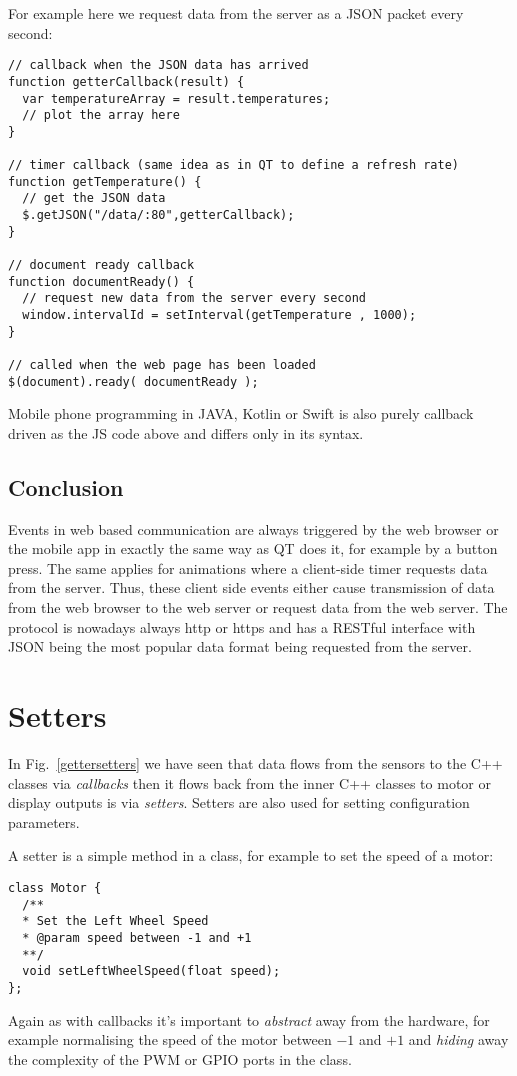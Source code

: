 \documentclass[12pt]{report}
\begin{document}
For example here we request data from the server as a JSON
packet every second:

\begin{verbatim}
// callback when the JSON data has arrived
function getterCallback(result) {
  var temperatureArray = result.temperatures;
  // plot the array here
}

// timer callback (same idea as in QT to define a refresh rate)
function getTemperature() {
  // get the JSON data
  $.getJSON("/data/:80",getterCallback);
}

// document ready callback
function documentReady() {
  // request new data from the server every second
  window.intervalId = setInterval(getTemperature , 1000);
}

// called when the web page has been loaded
$(document).ready( documentReady );
\end{verbatim}

Mobile phone programming in JAVA, Kotlin or Swift is also purely
callback driven as the JS code above and differs only in its syntax.

\section{Conclusion}
Events in web based communication are always triggered by the web
browser or the mobile app in exactly the same way as QT does it, for
example by a button press. The same applies for animations where a
client-side timer requests data from the server. Thus, these client
side events either cause transmission of data from the web browser to
the web server or request data from the web server. The protocol is
nowadays always http or https and has a RESTful interface with JSON
being the most popular data format being requested from the server.


\chapter{Setters}
In Fig.~\ref{gettersetters} we have seen that data flows from
the sensors to the C++ classes via \textsl{callbacks} then it flows
back from the inner C++ classes to motor or display outputs is via
\textsl{setters}. Setters are also used for setting configuration
parameters.

A setter is a simple method in a class, for example to set the
speed of a motor:
\begin{verbatim}
class Motor {
  /**
  * Set the Left Wheel Speed
  * @param speed between -1 and +1
  **/
  void setLeftWheelSpeed(float speed);
};
\end{verbatim}
Again as with callbacks it's important to \textsl{abstract} away from the
hardware, for example normalising the speed of the
motor between $-1$ and $+1$ and \textsl{hiding} away the complexity of the
PWM or GPIO ports in the class.
\end{document}
